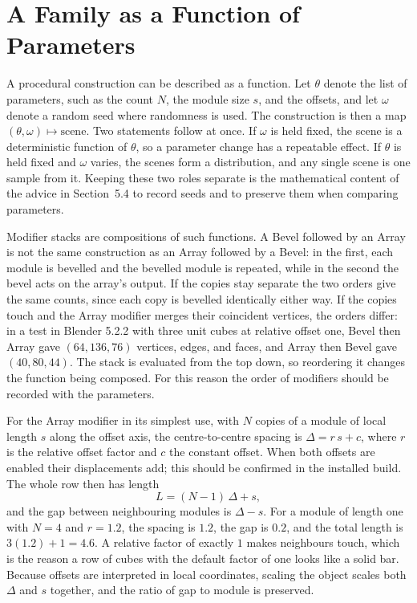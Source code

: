 \section{A Family as a Function of Parameters}

A procedural construction can be described as a function. Let $\theta$ denote the list of parameters, such as the count $N$, the module size $s$, and the offsets, and let $\omega$ denote a random seed where randomness is used. The construction is then a map $(\theta,\omega)\mapsto\text{scene}$. Two statements follow at once. If $\omega$ is held fixed, the scene is a deterministic function of $\theta$, so a parameter change has a repeatable effect. If $\theta$ is held fixed and $\omega$ varies, the scenes form a distribution, and any single scene is one sample from it. Keeping these two roles separate is the mathematical content of the advice in Section~5.4 to record seeds and to preserve them when comparing parameters.

Modifier stacks are compositions of such functions. A Bevel followed by an Array is not the same construction as an Array followed by a Bevel: in the first, each module is bevelled and the bevelled module is repeated, while in the second the bevel acts on the array's output. If the copies stay separate the two orders give the same counts, since each copy is bevelled identically either way. If the copies touch and the Array modifier merges their coincident vertices, the orders differ: in a test in Blender 5.2.2 with three unit cubes at relative offset one, Bevel then Array gave $(64,136,76)$ vertices, edges, and faces, and Array then Bevel gave $(40,80,44)$. The stack is evaluated from the top down, so reordering it changes the function being composed. For this reason the order of modifiers should be recorded with the parameters.

For the Array modifier in its simplest use, with $N$ copies of a module of local length $s$ along the offset axis, the centre-to-centre spacing is $\Delta=r\,s+c$, where $r$ is the relative offset factor and $c$ the constant offset. When both offsets are enabled their displacements add; this should be confirmed in the installed build. The whole row then has length
\[
  L=(N-1)\,\Delta+s,
\]
and the gap between neighbouring modules is $\Delta-s$. For a module of length one with $N=4$ and $r=1.2$, the spacing is $1.2$, the gap is $0.2$, and the total length is $3(1.2)+1=4.6$. A relative factor of exactly $1$ makes neighbours touch, which is the reason a row of cubes with the default factor of one looks like a solid bar. Because offsets are interpreted in local coordinates, scaling the object scales both $\Delta$ and $s$ together, and the ratio of gap to module is preserved.

